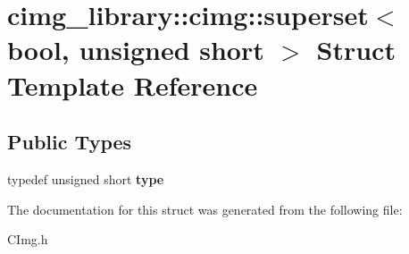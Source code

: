\hypertarget{structcimg__library_1_1cimg_1_1superset_3_01bool_00_01unsigned_01short_01_4}{\section{cimg\-\_\-library\-:\-:cimg\-:\-:superset$<$ bool, unsigned short $>$ Struct Template Reference}
\label{structcimg__library_1_1cimg_1_1superset_3_01bool_00_01unsigned_01short_01_4}
}
\subsection*{Public Types}
\begin{DoxyCompactItemize}
\item 
\hypertarget{structcimg__library_1_1cimg_1_1superset_3_01bool_00_01unsigned_01short_01_4_a4c2823bdb4b3a7e505b18e477b8505cc}{typedef unsigned short {\bfseries type}}\label{structcimg__library_1_1cimg_1_1superset_3_01bool_00_01unsigned_01short_01_4_a4c2823bdb4b3a7e505b18e477b8505cc}

\end{DoxyCompactItemize}


The documentation for this struct was generated from the following file\-:\begin{DoxyCompactItemize}
\item 
C\-Img.\-h\end{DoxyCompactItemize}

